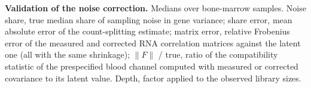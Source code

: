 \begin{table}[h]
\caption{\textbf{Validation of the noise correction.} Medians over
\RcBmSamples{} bone-marrow samples. Noise share, true median share of sampling
noise in gene variance; share error, mean absolute error of the count-splitting
estimate; matrix error, relative Frobenius error of the measured and corrected RNA
correlation matrices against the latent one (all with the same shrinkage);
$\|F\|$ / true, ratio of the compatibility statistic of the prespecified blood channel
computed with measured or corrected covariance to its latent value. Depth, factor
applied to the observed library sizes.}
\label{tab:sim}
\centering\footnotesize\setlength{\tabcolsep}{4pt}

\end{table}
